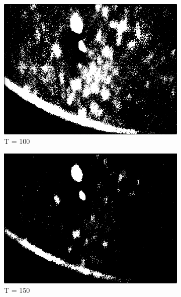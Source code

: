 \begin{figure}
        \centering
        \begin{subfigure}[b]{0.4\textwidth}
                \includegraphics[scale = 0.2]{img/thresh100}
                \caption{T = 100}
        \end{subfigure}
		\quad
        \begin{subfigure}[b]{0.4\textwidth}
                \includegraphics[scale = 0.2]{img/thresh150}
                \caption{T = 150}
        \end{subfigure} \hfill \\ \mbox{}\\
        \begin{subfigure}[b]{0.4\textwidth}

\end{subfigure}
\end{figure}
